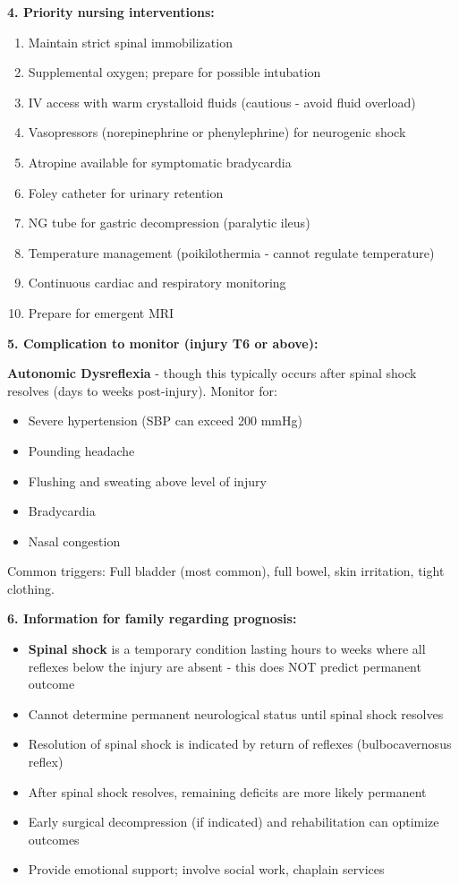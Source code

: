 \documentclass[11pt]{article}
\begin{document}
\begin{tcolorbox}[colback=green!5!white,colframe=green!75!black,title=Case Study 2 - Answers]
\textbf{4. Priority nursing interventions:}

\begin{enumerate}
    \item Maintain strict spinal immobilization
    \item Supplemental oxygen; prepare for possible intubation
    \item IV access with warm crystalloid fluids (cautious - avoid fluid overload)
    \item Vasopressors (norepinephrine or phenylephrine) for neurogenic shock
    \item Atropine available for symptomatic bradycardia
    \item Foley catheter for urinary retention
    \item NG tube for gastric decompression (paralytic ileus)
    \item Temperature management (poikilothermia - cannot regulate temperature)
    \item Continuous cardiac and respiratory monitoring
    \item Prepare for emergent MRI
\end{enumerate}

\textbf{5. Complication to monitor (injury T6 or above):}

\textbf{Autonomic Dysreflexia} - though this typically occurs after spinal shock resolves (days to weeks post-injury). Monitor for:
\begin{itemize}
    \item Severe hypertension (SBP can exceed 200 mmHg)
    \item Pounding headache
    \item Flushing and sweating above level of injury
    \item Bradycardia
    \item Nasal congestion
\end{itemize}
Common triggers: Full bladder (most common), full bowel, skin irritation, tight clothing.

\textbf{6. Information for family regarding prognosis:}

\begin{itemize}
    \item \textbf{Spinal shock} is a temporary condition lasting hours to weeks where all reflexes below the injury are absent - this does NOT predict permanent outcome
    \item Cannot determine permanent neurological status until spinal shock resolves
    \item Resolution of spinal shock is indicated by return of reflexes (bulbocavernosus reflex)
    \item After spinal shock resolves, remaining deficits are more likely permanent
    \item Early surgical decompression (if indicated) and rehabilitation can optimize outcomes
    \item Provide emotional support; involve social work, chaplain services
\end{itemize}
\end{tcolorbox}
\end{document}
